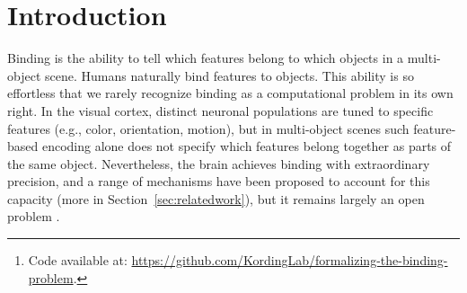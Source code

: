 \documentclass{article}
\theoremstyle{plain}
\theoremstyle{definition}
\theoremstyle{remark}
\begin{document}
\begin{abstract}
Representations of the world, arguably, contain information about features (e.g. something is blue, something is a circle) but also information about which features are part of the same object (e.g. the circle is blue), which we call binding information. Any system with the ability to understand scenes with multiple objects must be able to solve the binding problem: it needs to know which features belong together. However, despite work showing that Vision Transformers (ViTs) know which patches belong together, it is not known whether current deep learning models learn to exhibit binding information, i.e., for features. We may believe that there is not much binding information, after all misattributing features to wrong objects is a common failure of ViT-based architectures, especially in scenes with objects sharing features. Here we formalize the binding problem with an information-theoretic approach, and introduce a probing method to measure binding information in model representations. We perform experiments on ViTs, measuring binding from different components of the architecture, such as the image summary token \texttt{[CLS]} or the spatial tokens. We use datasets with different binding challenges, such as feature sharing, occlusion, and natural features, while comparing the performance of several pre-trained ViTs. Overall, our research demonstrates binding as a key ingredient to strong visual recognition and reasoning.\footnote{Code available at: \url{https://github.com/KordingLab/formalizing-the-binding-problem}.}
\end{abstract}

\section{Introduction}

Binding is the ability to tell which features belong to which objects in a multi-object scene. Humans naturally bind features to objects. This ability is so effortless that we rarely recognize binding as a computational problem in its own right. In the visual cortex, distinct neuronal populations are tuned to specific features (e.g., color, orientation, motion), but in multi-object scenes such feature-based encoding alone does not specify which features belong together as parts of the same object. Nevertheless, the brain achieves binding with extraordinary precision, and a range of mechanisms have been proposed to account for this capacity \cite{TREISMAN198097, vonderMalsburg1981Correlation, zhang2020neural} (more in Section~\ref{sec:relatedwork}), but it remains largely an open problem \cite{Yu2023-BindingProblem2}.
\end{document}

